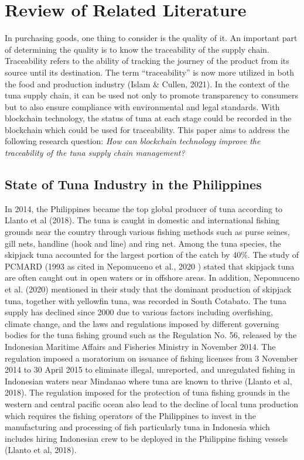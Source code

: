 \chapter{Review of Related Literature}
\label{sec:relatedlit}

In purchasing goods, one thing to consider is the quality of it. An important part of determining the quality is to know the traceability of the supply chain. Traceability refers to the ability of tracking the journey of the product from its source until its destination. The term “traceability” is now more utilized in both the food and production industry (Islam \& Cullen, 2021).  In the context of the tuna supply chain, it can be used not only to promote transparency to consumers but to also ensure compliance with environmental and legal standards. With blockchain technology, the status of tuna at each stage could be recorded in the blockchain which could be used for traceability. This paper aims to address the following research question: \textit{How can blockchain technology improve the traceability of the tuna supply chain management?}


\section{State of Tuna Industry in the Philippines}
In 2014, the Philippines became the top global producer of tuna according to Llanto et al (2018). The tuna is caught in domestic and international fishing grounds near the country through various fishing methods such as purse seines, gill nets, handline (hook and line) and ring net. Among the tuna species, the skipjack tuna accounted for the largest portion of the catch by 40\%. The study of PCMARD (1993 as cited in Nepomuceno et al., 2020 ) stated that skipjack tuna are often caught out in open waters or in offshore areas. In addition, Nepomuceno et al. (2020) mentioned in their study that the dominant production of skipjack tuna, together with yellowfin tuna, was recorded in South Cotabato.
The tuna supply has declined since 2000 due to various factors including overfishing, climate change, and the laws and regulations imposed by different governing bodies for the tuna fishing ground such as the Regulation No. 56, released by the Indonesian Maritime Affairs and Fisheries Ministry in November 2014. The regulation imposed a moratorium on issuance of fishing licenses from 3 November 2014 to 30 April 2015 to eliminate illegal, unreported, and unregulated fishing in Indonesian waters near Mindanao where tuna are known to thrive (Llanto et al, 2018). The regulation imposed for the protection of tuna fishing grounds in the western and central pacific ocean also lead to the decline of local tuna production which requires the  fishing operators of the Philippines to invest in the manufacturing and processing of fish particularly tuna in Indonesia which includes hiring Indonesian crew to be deployed in the Philippine fishing vessels (Llanto et al, 2018).

